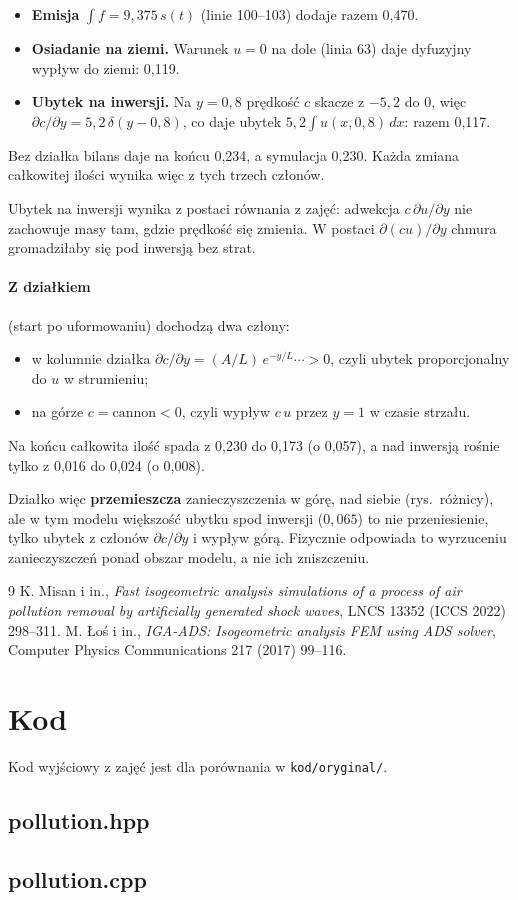 \documentclass[11pt,a4paper]{article}
\begin{document}
\begin{itemize}
\item \textbf{Emisja} $\int f = 9{,}375\,s(t)$ (linie 100--103) dodaje razem 0,470.
\item \textbf{Osiadanie na ziemi.} Warunek $u = 0$ na dole (linia 63) daje dyfuzyjny wypływ
  do ziemi: 0,119.
\item \textbf{Ubytek na inwersji.} Na $y = 0{,}8$ prędkość $c$ skacze z $-5{,}2$ do 0, więc
  $\partial c/\partial y = 5{,}2\,\delta(y - 0{,}8)$, co daje ubytek
  $5{,}2\int u(x, 0{,}8)\,dx$: razem 0,117.
\end{itemize}

Bez działka bilans daje na końcu 0,234, a symulacja 0,230. Każda zmiana całkowitej ilości
wynika więc z tych trzech członów.

Ubytek na inwersji wynika z postaci równania z zajęć: adwekcja
$c\,\partial u/\partial y$ nie zachowuje masy tam, gdzie prędkość się zmienia. W postaci
$\partial(cu)/\partial y$ chmura gromadziłaby się pod inwersją bez strat.

\paragraph{Z działkiem} (start po uformowaniu) dochodzą dwa człony:
\begin{itemize}
\item w kolumnie działka $\partial c/\partial y = (A/L)\,e^{-y/L}\cdots > 0$, czyli ubytek
  proporcjonalny do $u$ w strumieniu;
\item na górze $c = \mathrm{cannon} < 0$, czyli wypływ $c\,u$ przez $y = 1$ w czasie strzału.
\end{itemize}
Na końcu całkowita ilość spada z 0,230 do 0,173 (o 0,057), a nad inwersją rośnie tylko
z 0,016 do 0,024 (o 0,008).

Działko więc \textbf{przemieszcza} zanieczyszczenia w górę, nad siebie (rys.\ różnicy), ale
w tym modelu większość ubytku spod inwersji ($0{,}065$) to nie przeniesienie, tylko ubytek
z członów $\partial c/\partial y$ i wypływ górą. Fizycznie odpowiada to wyrzuceniu
zanieczyszczeń ponad obszar modelu, a nie ich zniszczeniu.

\begin{thebibliography}{9}
 K. Misan i in., \emph{Fast isogeometric analysis simulations of a process of air
  pollution removal by artificially generated shock waves}, LNCS 13352 (ICCS 2022) 298--311.
 M. Łoś i in., \emph{IGA-ADS: Isogeometric analysis FEM using ADS solver},
  Computer Physics Communications 217 (2017) 99--116.
\end{thebibliography}

\appendix
\section{Kod}
\label{sec:kod}

Kod wyjściowy z zajęć jest dla porównania w \texttt{kod/oryginal/}.

\subsection*{pollution.hpp}


\subsection*{pollution.cpp}

\end{document}
